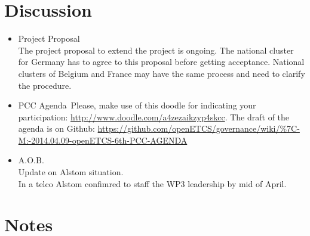 \documentclass[a4paper, 11pt]{article}
\begin{document}
\section{Discussion}
\begin{itemize}
\item Project Proposal\\
The project proposal to extend the project is ongoing. The national cluster for Germany has to agree to this proposal before getting acceptance. National clusters of Belgium and  France may have the same process and need to clarify the procedure.

\item PCC Agenda\
Please, make use of this doodle for indicating your participation: \url{http://www.doodle.com/a4zezaikzyp4skcc}. The draft of the agenda is on Github: \url{https://github.com/openETCS/governance/wiki/%7C-M:-2014.04.09-openETCS-6th-PCC-AGENDA}

\item A.O.B.\\
Update on Alstom situation.\\
In a telco Alstom confimred to staff the WP3 leadership by mid of April.

\end{itemize}

\section{Notes}
\end{document}
